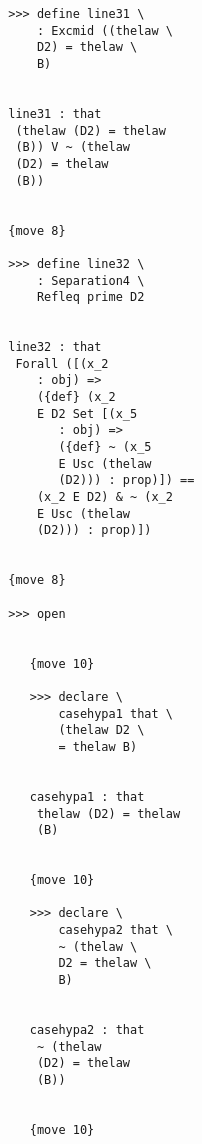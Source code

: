 \documentclass[12pt]{article}
\begin{document}
\begin{verbatim}
                           >>> define line31 \
                               : Excmid ((thelaw \
                               D2) = thelaw \
                               B)


                           line31 : that 
                            (thelaw (D2) = thelaw 
                            (B)) V ~ (thelaw 
                            (D2) = thelaw 
                            (B))


                           {move 8}

                           >>> define line32 \
                               : Separation4 \
                               Refleq prime D2


                           line32 : that 
                            Forall ([(x_2 
                               : obj) => 
                               ({def} (x_2 
                               E D2 Set [(x_5 
                                  : obj) => 
                                  ({def} ~ (x_5 
                                  E Usc (thelaw 
                                  (D2))) : prop)]) == 
                               (x_2 E D2) & ~ (x_2 
                               E Usc (thelaw 
                               (D2))) : prop)])


                           {move 8}

                           >>> open


                              {move 10}

                              >>> declare \
                                  casehypa1 that \
                                  (thelaw D2 \
                                  = thelaw B)


                              casehypa1 : that 
                               thelaw (D2) = thelaw 
                               (B)


                              {move 10}

                              >>> declare \
                                  casehypa2 that \
                                  ~ (thelaw \
                                  D2 = thelaw \
                                  B)


                              casehypa2 : that 
                               ~ (thelaw 
                               (D2) = thelaw 
                               (B))


                              {move 10}


\end{verbatim}
\end{document}
